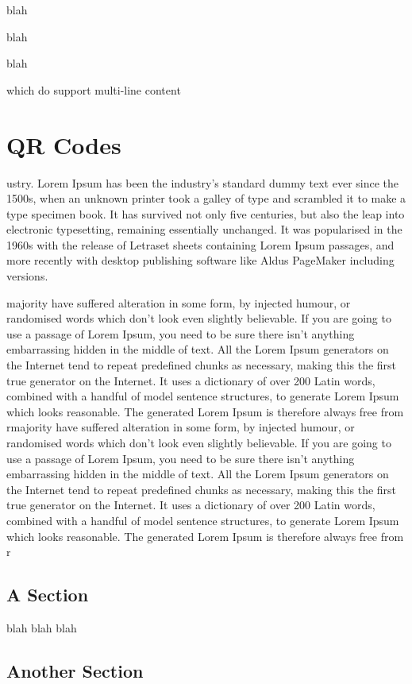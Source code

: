\documentclass[a4paper, 11pt]{report}
\begin{document}
\begin{callout-bold-red}
blah
\end{callout-bold-red}

\begin{callout-bold-orange}
blah
\end{callout-bold-orange}

\begin{callout-bold-green}
blah

which do support multi-line content
\end{callout-bold-green}

\chapter{QR Codes}



ustry. Lorem Ipsum has been the industry's standard dummy text ever since the 1500s, when an unknown printer took a galley of type and scrambled it to make a type specimen book. It has survived not only five centuries, but also the leap into electronic typesetting, remaining essentially unchanged. It was popularised in the 1960s with the release of Letraset sheets containing Lorem Ipsum passages, and more recently with desktop publishing software like Aldus PageMaker including versions.


majority have suffered alteration in some form, by injected humour, or randomised words which don't look even slightly believable. If you are going to use a passage of Lorem Ipsum, you need to be sure there isn't anything embarrassing hidden in the middle of text. All the Lorem Ipsum generators on the Internet tend to repeat predefined chunks as necessary, making this the first true generator on the Internet. It uses a dictionary of over 200 Latin words, combined with a handful of model sentence structures, to generate Lorem Ipsum which looks reasonable. The generated Lorem Ipsum is therefore always free from rmajority have suffered alteration in some form, by injected humour, or randomised words which don't look even slightly believable. If you are going to use a passage of Lorem Ipsum, you need to be sure there isn't anything embarrassing hidden in the middle of text. All the Lorem Ipsum generators on the Internet tend to repeat predefined chunks as necessary, making this the first true generator on the Internet. It uses a dictionary of over 200 Latin words, combined with a handful of model sentence structures, to generate Lorem Ipsum which looks reasonable. The generated Lorem Ipsum is therefore always free from r

\section{A Section}


blah blah blah

\section{Another Section}



\makedocumentbackpage
\end{document}
